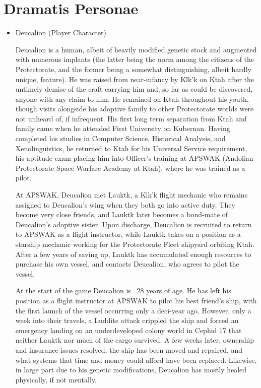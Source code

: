\section{Dramatis Personae}
\begin{itemize}
\item Deucalion (Player Character)

Deucalion is a human, albeit of heavily modified genetic stock and
augmented with numerous implants (the latter being the norm among the
citizens of the Protectorate, and the former being a somewhat
distinguishing, albeit hardly unique, feature). He was raised from
near-infancy by Klk'k on Ktah after the untimely demise of the craft
carrying him and, so far as could be discovered, anyone with any claim
to him.  He remained on Ktah throughout his youth, though visits
alongside his adoptive family to other Protectorate worlds were not
unheard of, if infrequent.  His first long term separation from Ktah
and family came when he attended First University on Kubernan. Having
completed his studies in Computer Science, Historical Analysis, and
Xenolinguistics, he returned to Ktah for his Universal Service
requirement, his aptitude exam placing him into Officer's training at
APSWAK (Andolian Protectorate Space Warfare Academy at Ktah), where he
was trained as a pilot.

At APSWAK, Deucalion met Lauktk, a Klk'k flight mechanic who remains
assigned to Deucalion's wing when they both go into active duty.  They
become very close friends, and Lauktk later becomes a bond-mate of
Deucalion's adoptive sister.  Upon discharge, Deucalion is recruited
to return to APSWAK as a flight instructor, while Lauktk takes on a
position as a starship mechanic working for the Protectorate Fleet
shipyard orbiting Ktah.  After a few years of saving up, Lauktk has
accumulated enough resources to purchase his own vessel, and contacts
Deucalion, who agrees to pilot the vessel.

At the start of the game Deucalion is ~28 years of age.  He has left
his position as a flight instructor at APSWAK to pilot his best
friend's ship, with the first launch of the vessel occurring only a
deci-year ago. However, only a week into their travels, a Luddite
attack crippled the ship and forced an emergency landing on an
underdeveloped colony world in Cephid 17 that neither Lauktk nor much
of the cargo survived. A few weeks later, ownership and insurance
issues resolved, the ship has been moved and repaired, and what
systems that time and money could afford have been replaced. Likewise,
in large part due to his genetic modifications, Deucalion has mostly
healed physically, if not mentally.


\end{itemize}
